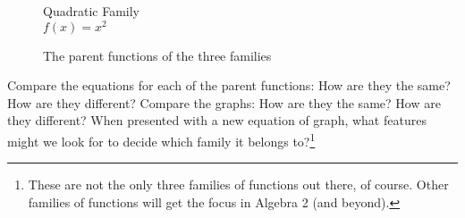 \begin{figure}
\begin{minipage}{0.32\linewidth}
\begin{tikzpicture}
\end{tikzpicture}
\end{minipage}
\begin{minipage}{0.32\linewidth}
\centering
Quadratic Family
\\ $f(x)=x^2$\par\medskip
{}
\end{minipage}
\caption{The parent functions of the three families}
\label{fig:parents}
\end{figure}

Compare the equations for each of the parent functions: How are they the same? How are they different? Compare the graphs: How are they the same? How are they different? When presented with a new equation of graph, what features might we look for to decide which family it belongs to?\footnote{These are not the only three families of functions out there, of course. Other families of functions will get the focus in Algebra 2 (and beyond).}

